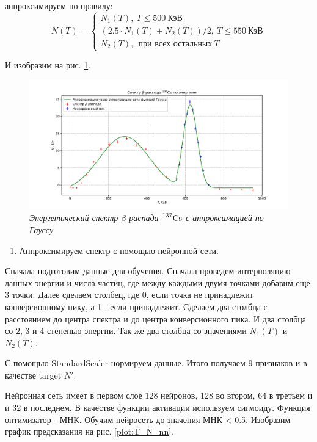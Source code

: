 \documentclass[a4paper,12pt]{article}
\begin{document}
аппроксимируем по правилу: \[ 
N(T) =
\begin{cases}
N_1(T), \ T \leq 500 \ \text{КэВ}  \\
\left(2.5 \cdot N_1(T) + N_2(T)\right) / 2, \ T \leq 550 \ \text{КэВ}  \\
N_2(T), \ \ \text{при всех остальных} \ T 
\end{cases}
\]

И изобразим на рис. \ref{plot:T_N_gauss}.

\FloatBarrier
\begin{figure}[!ht]
	\includegraphics[width=1.1\textwidth]{plots/T_N_gaus_model.pdf}
	\caption{\textit{Энергетический спектр $\beta$-распада $\prescript{137}{}{\text{Cs}}$ с аппроксимацией по Гауссу}}
	\label{plot:T_N_gauss}
\end{figure}
\FloatBarrier

\begin{enumerate}[resume]
    \item Аппроксимируем спектр с помощью нейронной сети.
\end{enumerate}

Сначала подготовим данные для обучения. Сначала проведем интерполяцию данных энергии и числа частиц, где между каждыми двумя точками добавим еще 3 точки. Далее сделаем столбец, где 0, если точка не принадлежит конверсионному пику, а 1 - если принадлежит. Сделаем два столбца с расстоянием до центра спектра и до центра конверсионного пика. И два столбца со 2, 3 и 4 степенью энергии. Так же два столбца со значениями $N_1(T)$ и $N_2(T)$.

\newpage

С помощью StandardScaler нормируем данные. Итого получаем 9 признаков и в качестве target $N'$.


Нейронная сеть имеет в первом слое 128 нейронов, 128 во втором, 64 в третьем и и 32 в последнем. В качестве функции активации используем сигмоиду. Функция оптимизатор - МНК. Обучим нейросеть до значения МНК < 0.5. Изобразим график предсказания на рис. \ref{plot:T_N_nn}.
\end{document}
